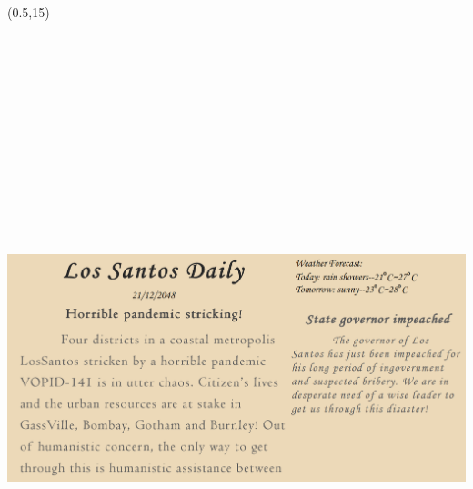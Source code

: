 \documentclass[hyperref={pdfpagelabels=false}]{beamer}
\begin{document}
\begin{frame}
	\begin{textblock}{9}(0.5,15)
		\begin{blankbox}
			\centering
			\includegraphics[angle=8,height=550pt]{img/news.png}
		\end{blankbox}
	\end{textblock}


\end{frame}
\end{document}
